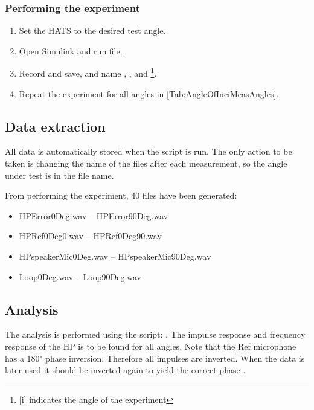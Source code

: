 \subsubsection{Performing the experiment}
\begin{enumerate}
	\item Set the HATS to the desired test angle. 
	\item Open Simulink and run file .
	\item Record and save, and name , ,  and \footnote{[i] indicates the angle of the experiment}.
	\item Repeat the experiment for all angles in \autoref{Tab:AngleOfInciMeasAngles}.
\end{enumerate}



\subsection{Data extraction}

All data is automatically stored when the script  is run. The only action to be taken is changing the name of the files after each measurement, so the angle under test is in the file name.


From performing the experiment, 40 files have been generated:
\begin{itemize}
	\item HPError0Deg.wav -- HPError90Deg.wav
	\item HPRef0Deg0.wav -- HPRef0Deg90.wav
	\item HPspeakerMic0Deg.wav -- 	HPspeakerMic90Deg.wav
	\item Loop0Deg.wav -- Loop90Deg.wav
\end{itemize}

\subsection{Analysis}
The analysis is performed using the script: .
The impulse response and frequency response of the HP is to be found for all angles.
Note that the Ref microphone has a 180$^\circ$ phase inversion. Therefore all impulses are inverted. When the data is later used it should be inverted again to yield the correct phase \cite{michandbook}.


